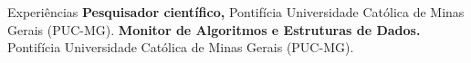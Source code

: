 \begin{rubric}{Experiências}
\entry*[2020 -- 2022]%
    \textbf{Pesquisador científico,} Pontifícia Universidade Católica de Minas Gerais (PUC-MG).
%
%
\entry*[2022]%
    \textbf{Monitor de Algoritmos e Estruturas de Dados.} Pontifícia Universidade Católica de Minas Gerais (PUC-MG).
%
\end{rubric}
